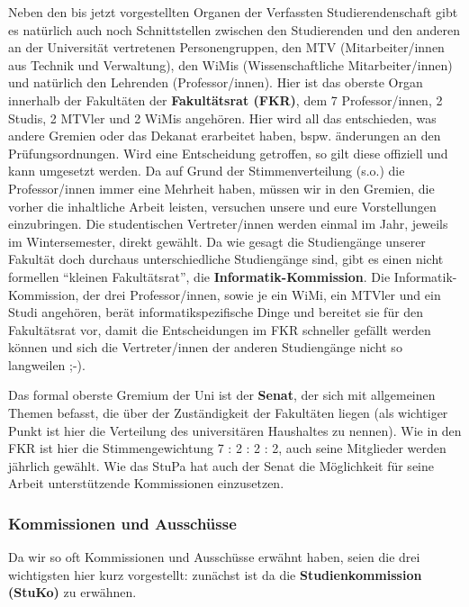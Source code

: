 Neben den bis jetzt vorgestellten Organen der Verfassten Studierendenschaft 
gibt es natürlich auch noch Schnittstellen zwischen den Studierenden und den anderen 
an der Universität vertretenen Personengruppen, den MTV (Mitarbeiter/innen 
aus Technik und Verwaltung), den WiMis (Wissenschaftliche Mitarbeiter/innen) und natürlich den Lehrenden (Professor/innen). Hier ist das 
oberste Organ innerhalb der Fakultäten der \textbf{Fakultätsrat (FKR)}, 
dem 7 Professor/innen, 2 Studis, 2 MTVler und 2 WiMis angehören. Hier wird all das 
entschieden, was andere Gremien oder das Dekanat erarbeitet haben, bspw. 
änderungen an den Prüfungsordnungen. Wird eine Entscheidung getroffen, so gilt diese offiziell und kann umgesetzt werden. Da auf Grund der 
Stimmenverteilung (s.o.) die Professor/innen immer eine Mehrheit haben, müssen wir 
in den Gremien, die vorher die inhaltliche Arbeit leisten, versuchen unsere 
und eure Vorstellungen einzubringen. Die studentischen 
Vertreter/innen werden einmal im Jahr, jeweils im Wintersemester, direkt gewählt. Da 
wie gesagt die Studiengänge unserer Fakultät doch durchaus unterschiedliche 
Studiengänge sind, gibt es einen nicht formellen "`kleinen Fakultätsrat"', 
die \textbf{Informatik-Kommission}. Die Informatik-Kommission, der drei Professor/innen, 
sowie je ein WiMi, ein MTVler und ein Studi angehören, berät informatikspezifische Dinge und 
bereitet sie für den Fakultätsrat vor, damit die Entscheidungen im FKR 
schneller gefällt werden können und sich die Vertreter/innen der anderen Studiengänge nicht so langweilen 
;-).

Das formal oberste Gremium der Uni ist der \textbf{Senat}, der sich mit 
allgemeinen Themen befasst, die über der Zuständigkeit der Fakultäten 
liegen (als wichtiger Punkt ist hier die Verteilung des universitären 
Haushaltes zu nennen). Wie in den FKR ist hier die Stimmengewichtung 7 : 2 : 2 
: 2, auch seine Mitglieder werden jährlich gewählt. Wie das StuPa hat auch der 
Senat die Möglichkeit für seine Arbeit unterstützende Kommissionen einzusetzen.

\subsubsection*{Kommissionen und Ausschüsse}

Da wir so oft Kommissionen und Ausschüsse erwähnt haben, seien die drei 
wichtigsten hier kurz vorgestellt: zunächst ist da die 
\textbf{Studienkommission (StuKo)} zu erwähnen.

